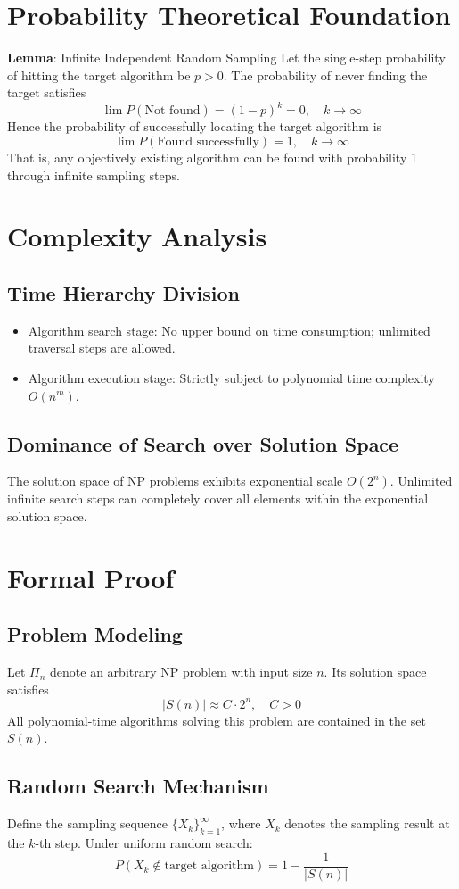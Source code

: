 \documentclass[10pt,a4paper]{article}
\begin{document}
\section{Probability Theoretical Foundation}
\noindent \textbf{Lemma}: Infinite Independent Random Sampling
Let the single-step probability of hitting the target algorithm be $p>0$. The probability of never finding the target satisfies
\[
\lim P(\text{Not found}) = (1-p)^k = 0,\quad k\to\infty
\]
Hence the probability of successfully locating the target algorithm is
\[
\lim P(\text{Found successfully}) = 1,\quad k\to\infty
\]
That is, any objectively existing algorithm can be found with probability 1 through infinite sampling steps.
\section{Complexity Analysis}
\subsection{Time Hierarchy Division}
\begin{itemize}[leftmargin=*]
    \item Algorithm search stage: No upper bound on time consumption; unlimited traversal steps are allowed.
    \item Algorithm execution stage: Strictly subject to polynomial time complexity $O(n^m)$.
\end{itemize}
\subsection{Dominance of Search over Solution Space}
The solution space of NP problems exhibits exponential scale $O(2^n)$. Unlimited infinite search steps can completely cover all elements within the exponential solution space.
\section{Formal Proof}
\subsection{Problem Modeling}
Let $\Pi_n$ denote an arbitrary NP problem with input size $n$. Its solution space satisfies
\[
|S(n)|\approx C\cdot 2^n,\quad C>0
\]
All polynomial-time algorithms solving this problem are contained in the set $S(n)$.
\subsection{Random Search Mechanism}
Define the sampling sequence $\{X_k\}_{k=1}^{\infty}$, where $X_k$ denotes the sampling result at the $k$-th step.
Under uniform random search:
\[
P(X_k \notin \text{target algorithm}) = 1-\frac{1}{|S(n)|}
\]
\end{document}
